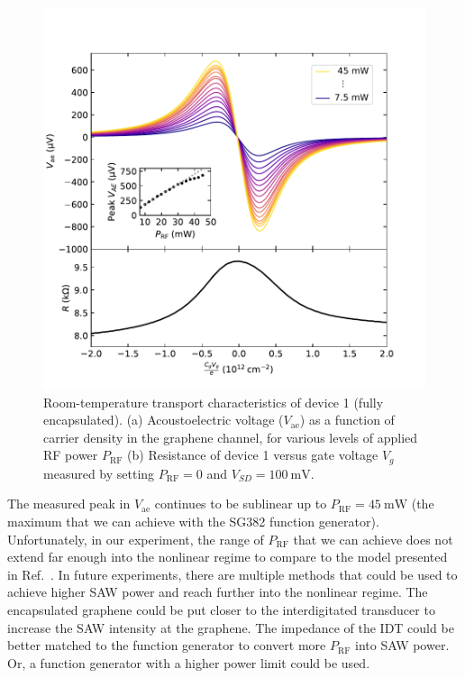 \documentclass[double,12pt,1in,seploa]{beavtex}
\begin{document}
\begin{figure}
    \includegraphics{AEV V3 power series plot_output.pdf}
    \caption{Room-temperature transport characteristics of device 1 (fully encapsulated). (a) Acoustoelectric voltage ($V_{\mathrm{ae}}$) as a function of carrier density in the graphene channel, for various levels of applied RF power $P_{\mathrm{RF}}$ (b) Resistance of device 1 versus gate voltage $V_g$ measured by setting $P_{\mathrm{RF}} = 0$ and $V_{SD} = \SI{100}{\milli\volt}$.}
    \label{AEV nonlinear series}
\end{figure}
The measured peak in $V_{\mathrm{ae}}$ continues to be sublinear up to $P_{\mathrm{RF}} = \SI{45}{\milli\watt}$ (the maximum that we can achieve with the SG382 function generator). Unfortunately, in our experiment, the range of $P_{\mathrm{RF}}$ that we can achieve does not extend far enough into the nonlinear regime to compare to the model presented in Ref.\ \cite{rotter_nonlinear_1999}. In future experiments, there are multiple methods that could be used to achieve higher SAW power and reach further into the nonlinear regime. The encapsulated graphene could be put closer to the interdigitated transducer to increase the SAW intensity at the graphene. The impedance of the IDT could be better matched to the function generator to convert more $P_{\mathrm{RF}}$ into SAW power. Or, a function generator with a higher power limit could be used.
\end{document}
